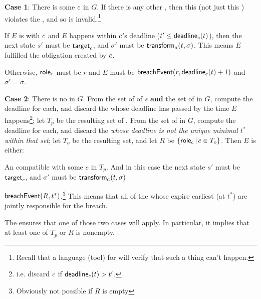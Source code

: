\documentclass[12pt]{article}
\begin{document}
{\bf Case 1}: There is some \enabled \mustntran $c$ in $G$. If there is any other \enabled \connection, then this \Contract (not just this \trace) violates the \uaocz, and so is invalid.\footnote{Recall that a language (tool) for \Contracts will verify that such a thing can't happen.}
\begin{PPI}
    \item If $E$ is \compatible with $c$ and $E$ happens within $c$'s deadline ($t' \leq \textsf{deadline}_{c}(t)$), then the next state $s'$ must be $\textsf{target}_{c}$, and $\sigma'$ must be $\textsf{transform}_{a}(t,\sigma)$. This means $E$ fulfilled the obligation created by $c$.
    \item Otherwise, $\textsf{role}_{e}$ must be $r$ and $E$ must be $\textsf{breachEvent}(r,\textsf{deadline}_{c}(t) + 1)$ and $\sigma' = \sigma$. %
\end{PPI}

{\bf Case 2}: There is no \enabled \mustntran in $G$. From the set of \enabled \mayntrans of $s$ {\bf and} the set of \enabled \rmustntrans in $G$, compute the deadline for each, and discard the \connections whose deadline has passed by the time $E$ happens\footnote{i.e. discard $c$ if $\textsf{deadline}_{c}(t) > t'$.};  let $T_p$ be the resulting set of \connections. From the set of \enabled \rmustntrans in $G$, compute the deadline for each, and discard the {\connections} {\it whose deadline is not the unique minimal \TimeStamp $t^*$ within that set}; let $T_o$ be the resulting set, and let $R$ be $\{ \textsf{role}_{c} \, \vert \, c \in T_{o} \}$. Then $E$ is either:
\begin{PPI}
	\item An \Event compatible with some \connection $e$ in $T_p$. And in this case the next state $s'$ must be $\textsf{target}_{c}$, and $\sigma'$ must be $\textsf{transform}_{a}(t,\sigma)$
	\item $\textsf{breachEvent}(R,t^*)$.\footnote{Obviously not possible if $R$ is empty} This means that all of the \Roles whose \enabled \rmustntran expire earliest (at $t^*$) are jointly responsible for the breach.
\end{PPI}
The \bostgcz ensures that one of those two cases will apply. In particular, it implies that at least one of $T_p$ or $R$ is nonempty.
\end{document}
